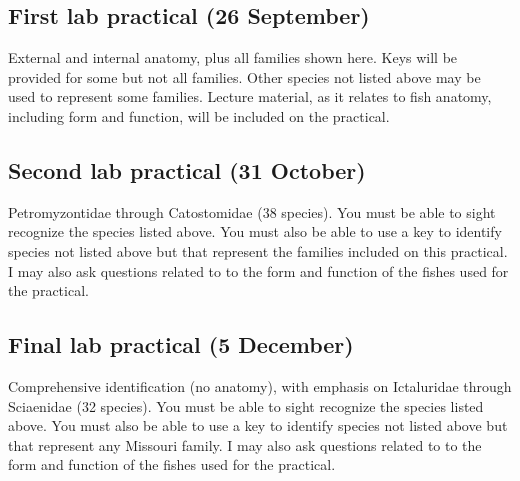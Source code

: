 \documentclass[11pt, hidelinks]{exam}
\begin{document}
\subsection*{First lab practical (26 September)}

External and internal anatomy, plus all families shown here.  Keys will be provided for some but not all families.  Other species not listed above may be used to represent some families. Lecture material, as it relates to fish anatomy, including form and function, will be included on the practical.%


\subsection*{Second lab practical (31 October)}

Petromyzontidae through Catostomidae (38 species).  You must be able to sight recognize the species listed above.  You must also be able to use a key to identify species not listed above but that represent the families included on this practical. I may also ask questions related to to the form and function of the fishes used for the practical.%


\subsection*{Final lab practical (5 December)}

Comprehensive identification (no anatomy), with emphasis on Ictaluridae through Sciaenidae (32 species). You must be able to sight recognize the species listed above.  You must also be able to use a key to identify species not listed above but that represent any Missouri family.  I may also ask questions related to to the form and function of the fishes used for the practical.
\end{document}
